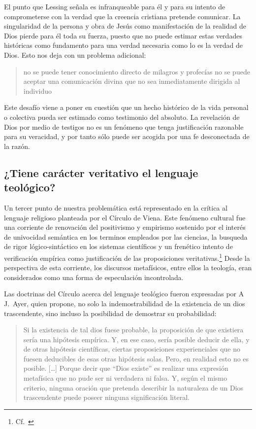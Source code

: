 El punto que Lessing señala es infranqueable para él y para su intento de
comprometerse con la verdad que la creencia cristiana pretende comunicar. La
singularidad de la persona y obra de Jesús como manifestación de la realidad de
Dios pierde para él toda su fuerza, puesto que no puede estimar estas verdades
históricas como fundamento para una verdad necesaria como lo es la verdad de
Dios. Esto nos deja con un problema adicional:
\blockquote[{\cite[294]{prades2015testimonio}}]{no se puede tener conocimiento
  directo de milagros y profecías \textelp{} no se puede aceptar una
  comunicación divina que no sea inmediatamente dirigida al individuo}.

Este desafío viene a poner en cuestión que un hecho histórico de la vida
personal o colectiva pueda ser estimado como testimonio del absoluto. La
revelación de Dios por medio de testigos no es un fenómeno que tenga
justificación razonable para su veracidad, y por tanto sólo puede ser acogida
por una fe desconectada de la razón.

\subsection{¿Tiene carácter veritativo el lenguaje teológico?}
Un tercer punto de nuestra problemática está representado en la crítica al
lenguaje religioso planteada por el Círculo de Viena. Este fenómeno cultural fue
una corriente de renovación del positivismo y empirismo sostenido por el interés
de univocidad semántica en los terminos empleados por las ciencias, la busqueda
de rigor lógico-sintáctico en los sistemas científicos y un frenético intento de
verificación empírica como justificación de las proposiciones
veritativas.\footnote{Cf.~\cite[152]{dominguez2009at}} Desde la perspectiva de
esta corriente, los discursos metafísicos, entre ellos la teología, eran
considerados como una forma de especulación incontrolada.

Las doctrinas del Círculo acerca del lenguaje teológico fueron expresadas por
A\,J.~Ayer, quien propone, no solo la indemostrabilidad de la existencia de un
dios trascendente, sino incluso la posibilidad de demostrar su probabilidad:
\blockquote[{\cite[155]{dominguez2009at}}]{Si la existencia de tal dios fuese
  probable, la proposición de que existiera sería una hipótesis empírica. Y, en
  ese caso, sería posible deducir de ella, y de otras hipótesis científicas,
  ciertas proposiciones experienciales que no fuesen deducibles de esas otras
  hipótesis solas. Pero, en realidad esto no es posible. [\ldots] Porque decir
  que ``Dios existe'' es realizar una expresión metafísica que no pude ser ni
  verdadera ni falsa. Y, según el mismo criterio, ninguna oración que pretenda
  describir la naturaleza de un Dios trascendente puede poseer ninguna
  significación literal.}

